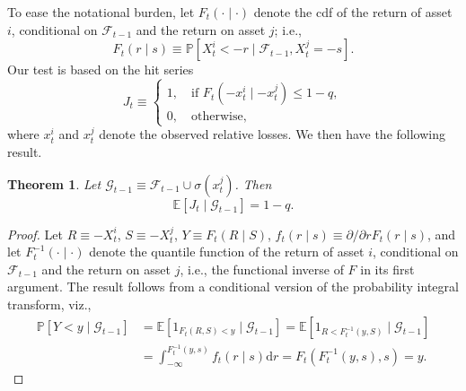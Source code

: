 \documentclass[12pt]{article}
\newtheorem{theorem}{Theorem}
\begin{document}
To ease the notational burden, let $F_t(\cdot\mid\cdot)$ denote the cdf of the return of asset $i$, conditional on $\mathcal{F}_{t-1}$ and the return on asset $j$; i.e.,
\[
 F_t(r\mid s)\equiv \mathbb{P}\left[X^{i}_t<-r\mid \mathcal{F}_{t-1}, X^{j}_t = -s \right].
\]
Our test is based on the hit series
\[
J_t\equiv \begin{cases}1,\quad \mbox{if } F_t (-x^{i}_t\mid -x^{j}_t) \leq 1-q,\\0,\quad \mbox{otherwise,}\end{cases}
\]
where $x^{i}_t$ and $x^{j}_t$ denote the observed relative losses. We then have the following result.
\begin{theorem}\label{th1}
Let $\mathcal{G}_{t-1}\equiv \mathcal{F}_{t-1} \cup \sigma(x^j_t)$. Then
\[\mathbb{E}[J_t\mid \mathcal{G}_{t-1}]=1-q. \]
\end{theorem}
\begin{proof}
Let $R\equiv -X^{i}_t$, $S\equiv -X^{j}_t$, $Y\equiv F_t (R\mid S)$, $f_t(r\mid s)\equiv \partial/\partial r F_t(r\mid s)$, and let $F^{-1}_t(\cdot\mid\cdot)$ denote the quantile function of the return of asset $i$, conditional on $\mathcal{F}_{t-1}$ and the return on asset $j$, i.e., the functional inverse of $F$ in its first argument.  The result follows from a conditional version of the probability integral transform, viz.,
\begin{align*}
\mathbb{P}\left[Y<y\mid \mathcal{G}_{t-1}\right]&=\mathbb{E}\left[1_{F_t(R, S)<y}\mid \mathcal{G}_{t-1}\right]=\mathbb{E}\left[1_{R<F_t^{-1}(y, S)}\mid \mathcal{G}_{t-1}\right]\\
&=\int_{-\infty}^{F_t^{-1}(y, s)}f_t(r\mid s)\mathrm{d}r
=F_t(F^{-1}_t(y, s), s)=y.
\end{align*}\end{proof}
%
\end{document}
